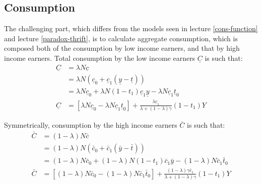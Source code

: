 \documentclass[]{book}
\theoremstyle{definition}
\theoremstyle{definition}
\theoremstyle{definition}
\theoremstyle{remark}
\begin{document}
\subsection{Consumption}\label{consumption}

The challenging part, which differs from the models seen in lecture
\ref{cons-function} and lecture \ref{paradox-thrift}, is to calculate
aggregate consumption, which is composed both of the consumption by low
income earners, and that by high income earners. Total consumption by
the low income earners \(\underline{C}\) is such that: \[
\begin{aligned}
\underline{C}&=\lambda N \underline{c}\\
&=\lambda N \left(\underline{c}_{0}+\underline{c}_{1}(\underline{y}-\underline{t})\right)\\
&=\lambda N  \underline{c}_{0} + \lambda N  (1-t_1) \underline{c}_{1}\underline{y}-\lambda N  \underline{c}_{1} \underline{t}_0\\
\underline{C}&=\left[\lambda N  \underline{c}_{0}-\lambda  N \underline{c}_{1} \underline{t}_0 \right]+ \frac{\lambda \underline{c}_{1}}{\lambda+(1-\lambda)\gamma}(1-t_1)Y
\end{aligned}
\]

Symmetrically, consumption by the high income earners \(\bar{C}\) is
such that: \[
\begin{aligned}
\bar{C}&=(1-\lambda) N \bar{c}\\
&=(1-\lambda) N \left(\bar{c}_{0}+\bar{c}_{1}(\bar{y}-\bar{t})\right)\\
&=(1-\lambda) N  \bar{c}_{0} + (1-\lambda) N (1-t_1) \bar{c}_{1}\bar{y}-(1-\lambda) N  \bar{c}_{1} \bar{t}_0\\
\bar{C}&=\left[(1-\lambda) N  \bar{c}_{0}-(1-\lambda) N  \bar{c}_{1} \bar{t}_0\right] + \frac{(1-\lambda) \gamma\bar{c}_{1}}{\lambda+(1-\lambda)\gamma}(1-t_1)Y
\end{aligned}
\]
\end{document}
